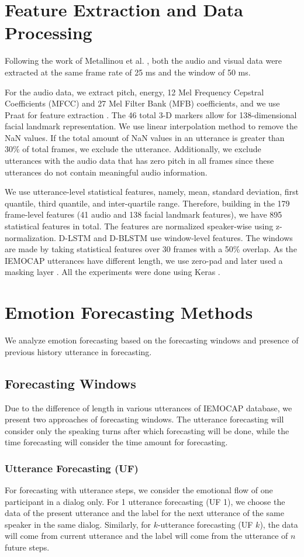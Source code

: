 \section{Feature Extraction and Data Processing}
Following the work of Metallinou et al. \cite{Meta}, both the audio and visual data were extracted at the same frame rate of 25 ms and the window of 50 ms. 

For the audio data, we extract pitch, energy, 12 Mel Frequency Cepstral Coefficients (MFCC) and 27 Mel Filter Bank (MFB) coefficients, and we use Praat for  feature extraction \cite{praat}.  The 46 total 3-D markers allow for 138-dimensional facial landmark representation. We use linear interpolation method to remove the NaN values. If the total amount of NaN values in an utterance is greater than 30\% of total frames, we exclude the utterance. Additionally, we exclude utterances with the audio data that has zero pitch in all frames since these utterances do not contain meaningful audio information.

We use utterance-level statistical features, namely, mean, standard deviation, first quantile, third quantile, and inter-quartile range. Therefore, building in the 179 frame-level features (41 audio and 138 facial landmark features), we have 895 statistical features in total. The features are normalized speaker-wise using z-normalization. D-LSTM and D-BLSTM use  window-level features. The windows are made by taking statistical features over 30 frames  with a 50\% overlap. As the IEMOCAP utterances have different length, we use zero-pad and later used a masking layer \cite{keras}. All the experiments were done using Keras \cite{keras}. 

\section{Emotion Forecasting Methods}
We analyze emotion forecasting based on the forecasting windows and presence of previous history utterance in forecasting.
\subsection{Forecasting Windows}
Due to the difference of length in various utterances of IEMOCAP database, we present two approaches of forecasting windows. The utterance forecasting will consider only the speaking turns after which forecasting will be done, while the time forecasting will consider the time amount for forecasting.
\subsubsection{Utterance Forecasting (UF)}
\label{utt_steps}
For forecasting with utterance steps, we consider the emotional flow of one participant in a dialog only. For 1 utterance forecasting (UF 1), we choose the data of the present utterance and the label for the next utterance of the same speaker in the same dialog. Similarly, for $k$-utterance forecasting (UF $k$), the data will come from current utterance and the label will come from the utterance of $n$ future steps.  


